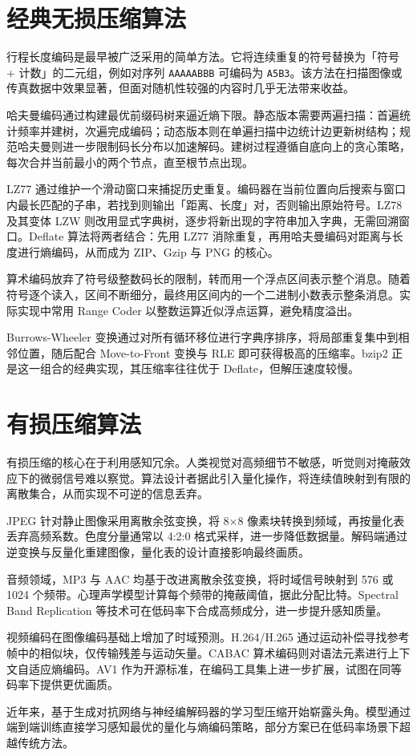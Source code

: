 \chapter{经典无损压缩算法}
行程长度编码是最早被广泛采用的简单方法。它将连续重复的符号替换为「符号 + 计数」的二元组，例如对序列 \texttt{AAAAABBB} 可编码为 \texttt{A5B3}。该方法在扫描图像或传真数据中效果显著，但面对随机性较强的内容时几乎无法带来收益。\par
哈夫曼编码通过构建最优前缀码树来逼近熵下限。静态版本需要两遍扫描：首遍统计频率并建树，次遍完成编码；动态版本则在单遍扫描中边统计边更新树结构；规范哈夫曼则进一步限制码长分布以加速解码。建树过程遵循自底向上的贪心策略，每次合并当前最小的两个节点，直至根节点出现。\par
LZ77 通过维护一个滑动窗口来捕捉历史重复。编码器在当前位置向后搜索与窗口内最长匹配的子串，若找到则输出「距离、长度」对，否则输出原始符号。LZ78 及其变体 LZW 则改用显式字典树，逐步将新出现的字符串加入字典，无需回溯窗口。Deflate 算法将两者结合：先用 LZ77 消除重复，再用哈夫曼编码对距离与长度进行熵编码，从而成为 ZIP、Gzip 与 PNG 的核心。\par
算术编码放弃了符号级整数码长的限制，转而用一个浮点区间表示整个消息。随着符号逐个读入，区间不断细分，最终用区间内的一个二进制小数表示整条消息。实际实现中常用 Range Coder 以整数运算近似浮点运算，避免精度溢出。\par
Burrows-Wheeler 变换通过对所有循环移位进行字典序排序，将局部重复集中到相邻位置，随后配合 Move-to-Front 变换与 RLE 即可获得极高的压缩率。bzip2 正是这一组合的经典实现，其压缩率往往优于 Deflate，但解压速度较慢。\par
\chapter{有损压缩算法}
有损压缩的核心在于利用感知冗余。人类视觉对高频细节不敏感，听觉则对掩蔽效应下的微弱信号难以察觉。算法设计者据此引入量化操作，将连续值映射到有限的离散集合，从而实现不可逆的信息丢弃。\par
JPEG 针对静止图像采用离散余弦变换，将 8×8 像素块转换到频域，再按量化表丢弃高频系数。色度分量通常以 4:2:0 格式采样，进一步降低数据量。解码端通过逆变换与反量化重建图像，量化表的设计直接影响最终画质。\par
音频领域，MP3 与 AAC 均基于改进离散余弦变换，将时域信号映射到 576 或 1024 个频带。心理声学模型计算每个频带的掩蔽阈值，据此分配比特。Spectral Band Replication 等技术可在低码率下合成高频成分，进一步提升感知质量。\par
视频编码在图像编码基础上增加了时域预测。H.264/H.265 通过运动补偿寻找参考帧中的相似块，仅传输残差与运动矢量。CABAC 算术编码则对语法元素进行上下文自适应熵编码。AV1 作为开源标准，在编码工具集上进一步扩展，试图在同等码率下提供更优画质。\par
近年来，基于生成对抗网络与神经编解码器的学习型压缩开始崭露头角。模型通过端到端训练直接学习感知最优的量化与熵编码策略，部分方案已在低码率场景下超越传统方法。\par
